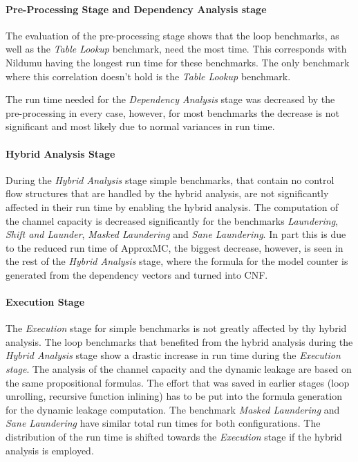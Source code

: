 \paragraph{Pre-Processing Stage and Dependency Analysis stage}
The evaluation of the pre-processing stage shows that the loop benchmarks, as well as the \emph{Table Lookup} benchmark, need the most time. This corresponds with Nildumu having the longest run time for these benchmarks. The only benchmark where this correlation doesn't hold is the \emph{Table Lookup} benchmark. 

The run time needed for the \emph{Dependency Analysis} stage was decreased by the pre-processing in every case, however, for most benchmarks the decrease is not significant and most likely due to normal variances in run time.

\paragraph{Hybrid Analysis Stage}
During the \emph{Hybrid Analysis} stage simple benchmarks, that contain no control flow structures that are handled by the hybrid analysis, are not significantly affected in their run time by enabling the hybrid analysis. The computation of the channel capacity is decreased significantly for the benchmarks \emph{Laundering}, \emph{Shift and Launder}, \emph{Masked Laundering} and \emph{Sane Laundering}. In part this is due to the reduced run time of ApproxMC, the biggest decrease, however, is seen in the rest of the \emph{Hybrid Analysis} stage, where the formula for the model counter is generated from the dependency vectors and turned into CNF.

\paragraph{Execution Stage}
The \emph{Execution} stage for simple benchmarks is not greatly affected by thy hybrid analysis. The loop benchmarks that benefited from the hybrid analysis during the \emph{Hybrid Analysis} stage show a drastic increase in run time during the \emph{Execution stage}. The analysis of the channel capacity and the dynamic leakage are based on the same propositional formulas. The effort that was saved in earlier stages (loop unrolling, recursive function inlining) has to be put into the formula generation for the dynamic leakage computation. The benchmark \emph{Masked Laundering} and \emph{Sane Laundering} have similar total run times for both configurations. The distribution of the run time is shifted towards the \emph{Execution} stage if the hybrid analysis is employed.

